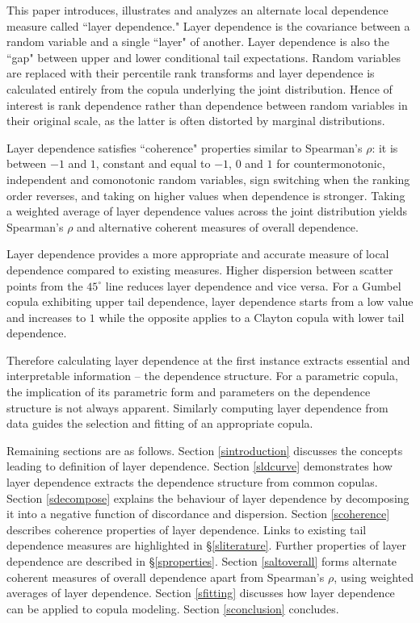 \documentclass[authoryear]{elsarticle}
\newcommand{\sref}[1]{\S\ref{#1}}
\newcommand{\aref}[1]{\ref{#1}}
\begin{document}
This paper introduces, illustrates and analyzes an alternate local dependence measure called  ``layer dependence." Layer dependence is the covariance between a random variable and a single ``layer" of another. Layer dependence is also the ``gap" between upper and lower conditional tail expectations. Random variables are replaced with their percentile rank transforms and layer dependence is calculated entirely from the copula underlying the joint distribution. Hence of interest is rank dependence rather than dependence between random variables in their original scale, as the latter is often distorted by marginal distributions.


Layer dependence satisfies ``coherence" properties similar to Spearman's $\rho$: it is between $-1$ and $1$, constant and equal to $-1$, $0$ and $1$ for countermonotonic, independent and comonotonic random variables, sign switching when the ranking order reverses, and taking on higher values when dependence is stronger. Taking a weighted average of layer dependence values across the joint distribution yields Spearman's $\rho$ and alternative coherent measures of overall dependence.


Layer dependence provides a more appropriate and accurate measure of local dependence compared to existing measures. Higher dispersion between scatter points from the $45^\circ$ line reduces layer dependence and vice versa. For a Gumbel copula exhibiting upper tail dependence, layer dependence starts from a low value and increases to $1$ while the opposite applies to a Clayton copula with lower tail dependence.

Therefore calculating layer dependence at the first instance extracts essential and interpretable information -- the dependence structure. For a parametric copula, the implication of its parametric form and parameters on the dependence structure is not always apparent. Similarly computing layer dependence from data guides the selection and fitting of an appropriate copula.


Remaining sections are as follows. Section \aref{sintroduction} discusses the concepts leading to definition of layer dependence. Section \aref{sldcurve} demonstrates how layer dependence extracts the dependence structure from common copulas. Section \aref{sdecompose} explains the behaviour of layer dependence by decomposing it into a negative function of discordance and dispersion. Section \aref{scoherence} describes coherence properties of layer dependence. Links to existing tail dependence measures are highlighted in  \sref{sliterature}. Further properties of layer dependence are described in  \sref{sproperties}. Section \aref{saltoverall} forms alternate coherent measures of overall dependence apart from Spearman's $\rho$, using weighted averages of layer dependence. Section \aref{sfitting} discusses how layer dependence can be applied to copula modeling. Section \aref{sconclusion} concludes.
\end{document}
